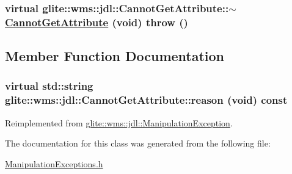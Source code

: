 \hypertarget{classglite_1_1wms_1_1jdl_1_1CannotGetAttribute_a1}{
\subsubsection[$\sim$CannotGetAttribute]{\setlength{\rightskip}{0pt plus 5cm}virtual glite::wms::jdl::Cannot\-Get\-Attribute::$\sim$\hyperlink{classglite_1_1wms_1_1jdl_1_1CannotGetAttribute}{Cannot\-Get\-Attribute} (void)  throw ()}}
\label{classglite_1_1wms_1_1jdl_1_1CannotGetAttribute_a1}




\subsection{Member Function Documentation}
\hypertarget{classglite_1_1wms_1_1jdl_1_1CannotGetAttribute_a2}{
\subsubsection[reason]{\setlength{\rightskip}{0pt plus 5cm}virtual std::string glite::wms::jdl::Cannot\-Get\-Attribute::reason (void) const}}
\label{classglite_1_1wms_1_1jdl_1_1CannotGetAttribute_a2}




Reimplemented from \hyperlink{classglite_1_1wms_1_1jdl_1_1ManipulationException_a4}{glite::wms::jdl::Manipulation\-Exception}.

The documentation for this class was generated from the following file:\begin{CompactItemize}
\item 
\hyperlink{ManipulationExceptions_8h}{Manipulation\-Exceptions.h}\end{CompactItemize}
